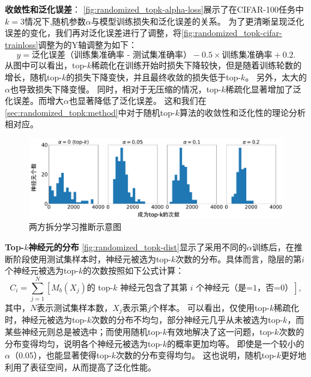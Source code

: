 \textbf{收敛性和泛化误差}：
\autoref{fig:randomized_topk-alpha-loss}展示了在CIFAR-100任务中$k=3$情况下,随机参数$\alpha$与模型训练损失和泛化误差的关系。
为了更清晰呈现泛化误差的变化，我们再对泛化误差进行了调整，将\autoref{fig:randomized_topk-cifar-trainloss}调整为的Y轴调整为如下：
\begin{equation}
    y = \text{泛化误差（训练集准确率 - 测试集准确率）} - 0.5 \times \text{训练集准确率} + 0.2.
\end{equation}
%
从图中可以看出，top-$k$稀疏化在训练开始时损失下降较快，但是随着训练轮数的增长，随机top-$k$的损失下降变快，并且最终收敛的损失低于top-$k$。
另外，太大的$\alpha$也导致损失下降变慢。
%
同时，相对于无压缩的情况，top-$k$稀疏化显著增加了泛化误差。而增大$\alpha$也显著降低了泛化误差。
%
这和我们在\autoref{sec:randomized_topk:method}中对于随机top-$k$算法的收敛性和泛化性的理论分析相对应。



\begin{figure}[h!]
    \centering
    \includegraphics[width=\linewidth]{Z_Resources/随机topk_cifar100-dist-topk.pdf}
    \caption{两方拆分学习推断示意图}
    \label{fig:randomized_topk-dist}
\end{figure}

\textbf{Top-$k$神经元的分布}
\autoref{fig:randomized_topk-dist}显示了采用不同的$\alpha$训练后，在推断阶段使用测试集样本时，神经元被选为top-$k$次数的分布。具体而言，隐层的第$i$个神经元被选为top-$k$的次数按照如下公式计算：
\begin{equation}
    C_i = \sum_{j=1}^N [\text{$M_b(X_j)$的 top-$k$ 神经元包含了其第 $i$ 个神经元（是=1，否=0）}],
\end{equation}
其中，$N$表示测试集样本数，$X_j$表示第$j$个样本。
%
%
可以看出，仅使用top-$k$稀疏化时，神经元被选为top-$k$次数的分布不均匀，部分神经元几乎从未被选为top-$k$，而某些神经元则总是被选中；而使用随机top-$k$有效地解决了这一问题，top-$k$次数的分布变得均匀，说明各个神经元被选为top-$k$的概率更加均等。
%
即使是一个较小的$\alpha$（0.05），也能显著使得top-$k$次数的分布变得均匀。
%
这也说明，随机top-$k$更好地利用了表征空间，从而提高了泛化性能。
%



